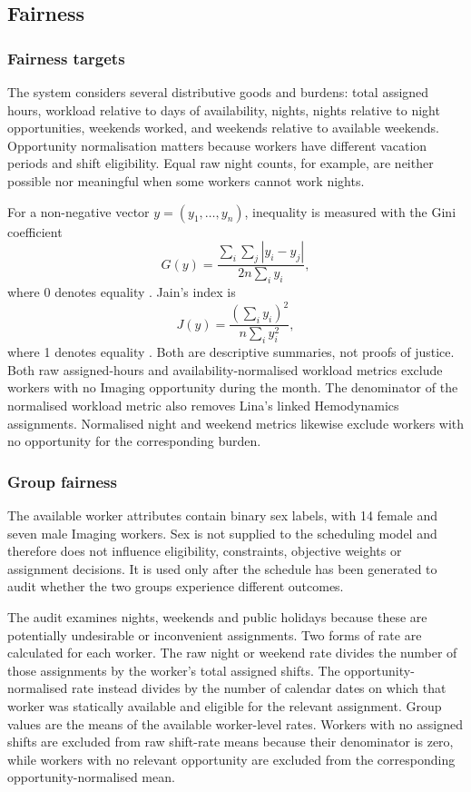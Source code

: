 \documentclass[11pt,a4paper]{article}
\begin{document}
\subsection{Fairness}

\subsubsection{Fairness targets}

The system considers several distributive goods and burdens: total assigned hours, workload relative to days of availability, nights, nights relative to night opportunities, weekends worked, and weekends relative to available weekends. Opportunity normalisation matters because workers have different vacation periods and shift eligibility. Equal raw night counts, for example, are neither possible nor meaningful when some workers cannot work nights.

For a non-negative vector $y=(y_1,\dots,y_n)$, inequality is measured with the Gini coefficient
\[
G(y)=\frac{\sum_i\sum_j |y_i-y_j|}{2n\sum_i y_i},
\]
where 0 denotes equality \cite{gini}. Jain's index is
\[
J(y)=\frac{(\sum_i y_i)^2}{n\sum_i y_i^2},
\]
where 1 denotes equality \cite{jain}. Both are descriptive summaries, not proofs of justice. Both raw assigned-hours and availability-normalised workload metrics exclude workers with no Imaging opportunity during the month. The denominator of the normalised workload metric also removes Lina's linked Hemodynamics assignments. Normalised night and weekend metrics likewise exclude workers with no opportunity for the corresponding burden.

\subsubsection{Group fairness}

The available worker attributes contain binary sex labels, with 14 female and seven male Imaging workers. Sex is not supplied to the scheduling model and therefore does not influence eligibility, constraints, objective weights or assignment decisions. It is used only after the schedule has been generated to audit whether the two groups experience different outcomes.

The audit examines nights, weekends and public holidays because these are potentially undesirable or inconvenient assignments. Two forms of rate are calculated for each worker. The raw night or weekend rate divides the number of those assignments by the worker's total assigned shifts. The opportunity-normalised rate instead divides by the number of calendar dates on which that worker was statically available and eligible for the relevant assignment. Group values are the means of the available worker-level rates. Workers with no assigned shifts are excluded from raw shift-rate means because their denominator is zero, while workers with no relevant opportunity are excluded from the corresponding opportunity-normalised mean.
\end{document}
